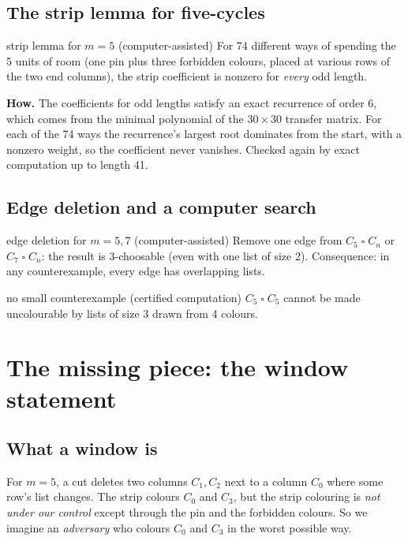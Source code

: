 \documentclass[11pt,oneside,openany]{book}
\newcommand{\T}{\mathbin{\square}}
\begin{document}
\section{The strip lemma for five-cycles}

\begin{proved}{strip lemma for $m=5$ (computer-assisted)}
For 74 different ways of spending the 5 units of room (one pin plus three forbidden colours,
placed at various rows of the two end columns), the strip coefficient is nonzero for
\emph{every} odd length.
\end{proved}

\textbf{How.} The coefficients for odd lengths satisfy an exact recurrence of order 6, which comes
from the minimal polynomial of the $30 \times 30$ transfer matrix. For each of the 74 ways the
recurrence's largest root dominates from the start, with a nonzero weight, so the coefficient
never vanishes. Checked again by exact computation up to length 41.

\section{Edge deletion and a computer search}

\begin{proved}{edge deletion for $m = 5, 7$ (computer-assisted)}
Remove one edge from $C_5 \T C_n$ or $C_7 \T C_n$: the result is 3-choosable (even with one
list of size 2). Consequence: in any counterexample, every edge has overlapping lists.
\end{proved}

\begin{proved}{no small counterexample (certified computation)}
$C_5 \T C_5$ cannot be made uncolourable by lists of size 3 drawn from 4 colours.
\end{proved}

\chapter{The missing piece: the window statement}

\section{What a window is}

For $m = 5$, a cut deletes two columns $C_1, C_2$ next to a column $C_0$ where some row's list
changes. The strip colours $C_0$ and $C_3$, but the strip colouring is \emph{not under our
control} except through the pin and the forbidden colours. So we imagine an \emph{adversary}
who colours $C_0$ and $C_3$ in the worst possible way.
\end{document}
